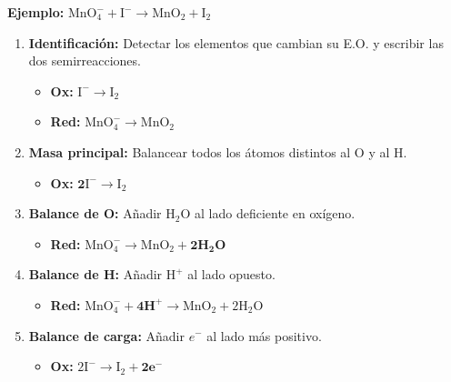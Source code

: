 \documentclass[letterpaper, 12pt, twoside]{article}
\newenvironment{formulabox}[1]{%
    \begin{tcolorbox}[colback=rojoSuave, colframe=rojoFuerte,
        title=\textbf{#1}, fonttitle=\bfseries]
}{%
    \end{tcolorbox}
}
\begin{document}
\begin{formulabox}{Pasos — Medio Básico}
\footnotesize
\textbf{Ejemplo:} $\text{MnO}_4^- + \text{I}^- \rightarrow \text{MnO}_2 + \text{I}_2$

\begin{enumerate}[leftmargin=15pt, itemsep=0.3em]
\vspace{0.2cm}
    \item \textbf{Identificación:} Detectar los elementos que cambian su E.O. y escribir las dos semirreacciones.
    \begin{itemize}[leftmargin=15pt, topsep=2pt, itemsep=0pt]
        \item \textbf{Ox:} $\text{I}^- \rightarrow \text{I}_2$
        \item \textbf{Red:} $\text{MnO}_4^- \rightarrow \text{MnO}_2$
    \end{itemize}
\vspace{0.2cm}
    \item \textbf{Masa principal:} Balancear todos los átomos distintos al O y al H.
    \begin{itemize}[leftmargin=15pt, topsep=2pt, itemsep=0pt]
        \item \textbf{Ox:} $\mathbf{2}\text{I}^- \rightarrow \text{I}_2$
    \end{itemize}
\vspace{0.2cm}
    \item \textbf{Balance de O:} Añadir $\text{H}_2\text{O}$ al lado deficiente en oxígeno.
    \begin{itemize}[leftmargin=15pt, topsep=2pt, itemsep=0pt]
        \item \textbf{Red:} $\text{MnO}_4^- \rightarrow \text{MnO}_2 + \mathbf{2H_2O}$
    \end{itemize}
\vspace{0.2cm}
    \item \textbf{Balance de H:} Añadir $\text{H}^+$ al lado opuesto.
    \begin{itemize}[leftmargin=15pt, topsep=2pt, itemsep=0pt]
        \item \textbf{Red:} $\text{MnO}_4^- + \mathbf{4H^+} \rightarrow \text{MnO}_2 + 2\text{H}_2\text{O}$
    \end{itemize}
\vspace{0.2cm}
    \item \textbf{Balance de carga:} Añadir $e^-$ al lado más positivo.
    \begin{itemize}[leftmargin=15pt, topsep=2pt, itemsep=0pt]
        \item \textbf{Ox:} $2\text{I}^- \rightarrow \text{I}_2 + \mathbf{2e^-}$

\end{itemize}
\end{enumerate}
\end{formulabox}
\end{document}
